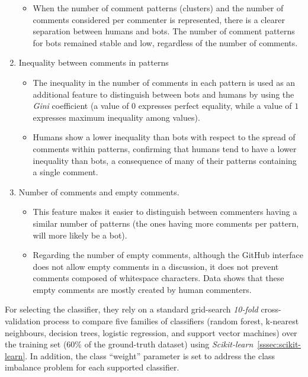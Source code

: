 \documentclass[a4paper, 12pt]{book}
\begin{document}
\begin{enumerate}
\begin{itemize}
            \item When the number of comment patterns (clusters) and the number of comments considered per commenter is represented, there is a clearer separation between humans and bots. The number of comment patterns for bots remained stable and low, regardless of the number of comments.
        \end{itemize}
    \item Inequality between comments in patterns
        \begin{itemize}
            \item The inequality in the number of comments in each pattern is used as an additional feature to distinguish between bots and humans by using the \textit{Gini} coefficient (a value of $0$ expresses perfect equality, while a value of $1$ expresses maximum inequality among values).
            \item Humans show a lower inequality than bots with respect to the spread of comments within patterns, confirming that humans tend to have a lower inequality than bots, a consequence of many of their patterns containing a single comment.
        \end{itemize}
    \item Number of comments and empty comments.
        \begin{itemize}
            \item This feature makes it easier to distinguish between commenters having a similar number of patterns (the ones having more comments per pattern, will more likely be a bot). 
            \item Regarding the number of empty comments, although the GitHub interface does not allow empty comments in a discussion, it does not prevent comments composed of whitespace characters. Data shows that these empty comments are mostly created by human commenters.
        \end{itemize}
\end{enumerate}

For selecting the classifier, they rely on a standard grid-search \textit{10-fold} cross-validation process to compare five families of classifiers (random forest, k-nearest neighbours, decision trees, logistic regression, and support vector machines) over the training set ($60\%$ of the ground-truth dataset) using \textit{Scikit-learn}~\ref{sssec:scikit-learn}. In addition, the class ``weight'' parameter is set to address the class imbalance problem for each supported classifier.
\end{document}
